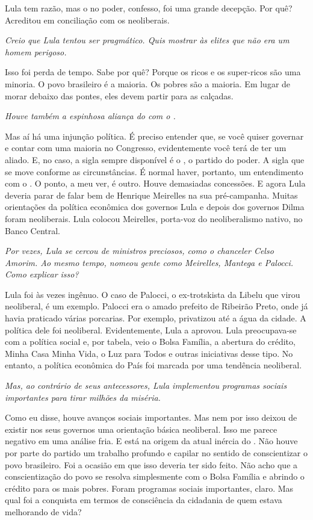 \normalfont
Lula tem razão, mas o  no poder, confesso, foi uma
grande decepção. Por quê? Acreditou em conciliação com os neoliberais.

\itshape
 Creio que Lula tentou ser pragmático. Quis mostrar às
elites que não era um homem perigoso.

\normalfont
Isso foi perda de tempo. Sabe por quê? Porque os ricos e
os super-ricos são uma minoria. O povo brasileiro é a maioria. Os pobres
são a maioria. Em lugar de morar debaixo das pontes, eles devem partir
para as calçadas.

\itshape
 Houve também a espinhosa aliança do  com o .

\normalfont
Mas aí há uma injunção política. É preciso entender que,
se você quiser governar e contar com uma maioria no Congresso,
evidentemente você terá de ter um aliado. E, no caso, a sigla sempre
disponível é o , o partido do poder. A sigla que se move conforme as
circunstâncias. É normal haver, portanto, um entendimento com o . O
ponto, a meu ver, é outro. Houve demasiadas concessões. E agora Lula
deveria parar de falar bem de Henrique Meirelles na sua pré-campanha.
Muitas orientações da política econômica dos governos Lula e depois dos
governos Dilma foram neoliberais. Lula colocou Meirelles, porta-voz do
neoliberalismo nativo, no Banco Central.

\itshape
 Por vezes, Lula se cercou de ministros preciosos, como
o chanceler Celso Amorim. Ao mesmo tempo, nomeou gente como Meirelles,
Mantega e Palocci. Como explicar isso?

\normalfont
Lula foi às vezes ingênuo. O caso de Palocci, o
ex-trotskista da Libelu que virou neoliberal, é um exemplo. Palocci era
o amado prefeito de Ribeirão Preto, onde já havia praticado várias
porcarias. Por exemplo, privatizou até a água da cidade. A política dele
foi neoliberal. Evidentemente, Lula a aprovou. Lula preocupava-se com a
política social e, por tabela, veio o Bolsa Família, a abertura do
crédito, Minha Casa Minha Vida, o Luz para Todos e outras iniciativas
desse tipo. No entanto, a política econômica do País foi marcada por uma
tendência neoliberal.

\itshape
 Mas, ao contrário de seus antecessores, Lula
implementou programas sociais importantes para tirar milhões da miséria.

\normalfont
Como eu disse, houve avanços sociais importantes. Mas nem
por isso deixou de existir nos seus governos uma orientação básica
neoliberal. Isso me parece negativo em uma análise fria. E está na
origem da atual inércia do . Não houve por parte do partido um
trabalho profundo e capilar no sentido de conscientizar o povo
brasileiro. Foi a ocasião em que isso deveria ter sido feito. Não acho
que a conscientização do povo se resolva simplesmente com o Bolsa
Família e abrindo o crédito para os mais pobres. Foram programas sociais
importantes, claro. Mas qual foi a conquista em termos de consciência da
cidadania de quem estava melhorando de vida?

